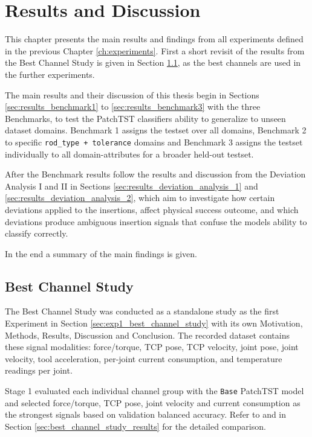 \chapter{Results and Discussion}
\label{ch:results}
This chapter presents the main results and findings from all experiments defined in the previous Chapter \ref{ch:experiments}. First a short revisit of the results from the Best Channel Study is given in Section \ref{sec:results_best_channel}, as the best channels are used in the further experiments.

The main results and their discussion of this thesis begin in Sections \ref{sec:results_benchmark1} to \ref{sec:results_benchmark3} with the three Benchmarks, to test the PatchTST classifiers ability to generalize to unseen dataset domains. Benchmark 1 assigns the testset over all domains, Benchmark 2 to specific \texttt{rod\_type + tolerance} domains and Benchmark 3 assigns the testset individually to all domain-attributes for a broader held-out testset.

After the Benchmark results follow the results and discussion from the Deviation Analysis I and II in Sections \ref{sec:results_deviation_analysis_1} and \ref{sec:results_deviation_analysis_2}, which aim to investigate how certain deviations applied to the insertions, affect physical success outcome, and which deviations produce ambiguous insertion signals that confuse the models ability to classify correctly.

In the end a summary of the main findings is given.


\section{Best Channel Study}
\label{sec:results_best_channel}
The Best Channel Study was conducted as a standalone study as the first Experiment in Section \ref{sec:exp1_best_channel_study} with its own Motivation, Methods, Results, Discussion and Conclusion.
The recorded dataset contains these signal modalities: force/torque, TCP pose, TCP velocity, joint pose, joint velocity, tool acceleration, per-joint current consumption, and temperature readings per joint.

Stage 1 evaluated each individual channel group with the \texttt{Base} PatchTST model and selected force/torque, TCP pose, joint velocity and current consumption as the strongest signals based on validation balanced accuracy. Refer to  and  in Section \ref{sec:best_channel_study_results} for the detailed comparison.

